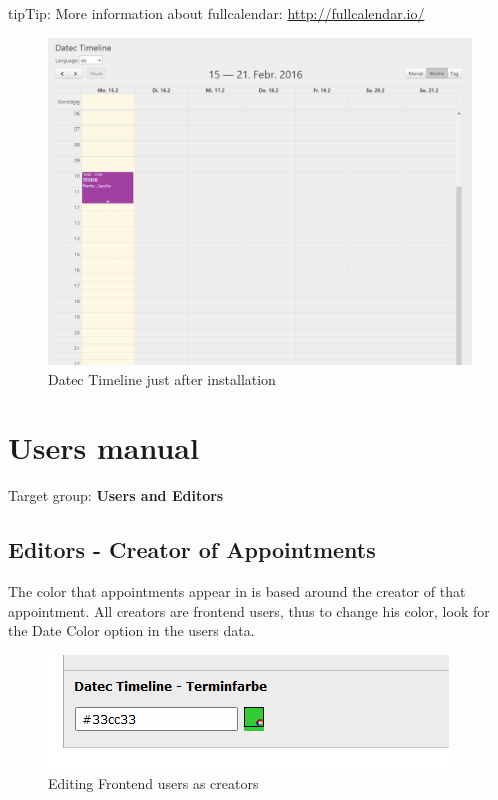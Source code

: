 \documentclass[a4paper,10pt,english]{sphinxmanual}
\begin{document}
\begin{notice}{tip}{Tip:}
More information about fullcalendar: \href{http://fullcalendar.io/}{http://fullcalendar.io/}
\end{notice}
\begin{figure}[htbp]
\centering
\capstart

\includegraphics{datec_timeline_01_overview.png}
\caption{Datec Timeline just after installation}\end{figure}


\chapter{Users manual}
\label{UsersManual/Index:id1}\label{UsersManual/Index:users-manual}\label{UsersManual/Index::doc}
Target group: \textbf{Users and Editors}


\section{Editors - Creator of Appointments}
\label{UsersManual/Index:editors-creator-of-appointments}
The color that appointments appear in is based around the creator of that appointment. All creators are frontend users, thus to change his color, look for the Date Color option in the users data.
\begin{figure}[htbp]
\centering
\capstart

\includegraphics{datec_timeline_04_creator1.png}
\caption{Editing Frontend users as creators}\end{figure}
\end{document}
